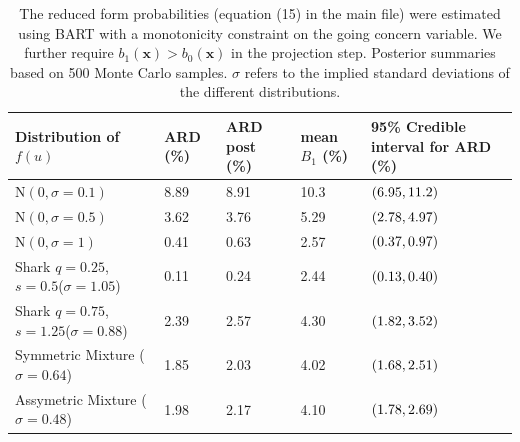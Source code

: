 \documentclass[aoas,preprint, 11pt, dvipsnames, table, x11name]{imsart}
\newcommand{\N}{\mbox{N}}
\renewcommand{\bm}[1]{\mathbf{#1}}
\theoremstyle{remark}
\begin{document}
	\begin{table}[h]
	\centering
	
	\begin{tabular}{lP{1.1cm}P{1.1cm}P{1.1cm}P{2.8cm}}
		
		\toprule
		Distribution of $f(u)$  & ARD (\%)&ARD post (\%)& mean $B_1$ (\%) &95\% Credible interval for ARD (\%)  \\ \midrule
		$\N(0,\sigma=0.1)$ &8.89&8.91&10.3&$\qty(6.95, 11.2)$\\ %
		$\N(0,\sigma=0.5)$ &3.62&3.76 &5.29 &$\qty(2.78, 4.97)$\\%
		$\N(0,\sigma=1)$&0.41&0.63&2.57&$\qty(0.37, 0.97)$\\
		Shark $q=0.25$, $s=0.5$($\sigma=1.05$)&0.11&0.24&2.44&$\qty(0.13, 0.40)$\\
		Shark $q=0.75$, $s=1.25$($\sigma=0.88$)&2.39&2.57&4.30&$\qty(1.82, 3.52)$\\
		
		Symmetric Mixture ($\sigma=0.64$)&1.85&2.03&4.02&$\qty(1.68, 2.51)$\\
		Assymetric Mixture ($\sigma=0.48$)&1.98&2.17&4.10&$\qty(1.78, 2.69)$\\
		
		\bottomrule%
	\end{tabular}
	\caption{The reduced form probabilities (equation (15) in the main file) were estimated using BART with a monotonicity constraint on the going concern variable.  We further require $b_1(\bm{x})>b_0(\bm{x})$ in the projection step.  Posterior summaries based on 500 Monte Carlo samples.  $\sigma$ refers to the implied standard deviations of the different distributions.}
	\label{resultssummary}
\end{table}
	
\end{document}
